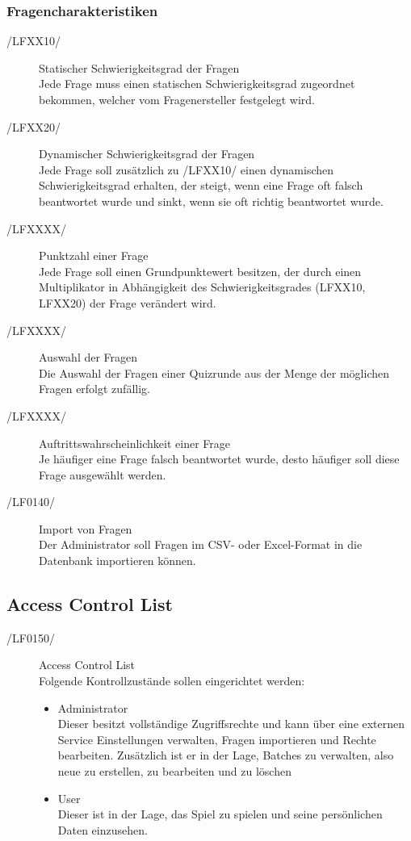 \documentclass[11pt,a4paper]{scrreprt}
\begin{document}
\subsubsection{Fragencharakteristiken}
\begin{description}
\item[/LFXX10/] Statischer Schwierigkeitsgrad der Fragen \\
Jede Frage muss einen statischen Schwierigkeitsgrad zugeordnet bekommen, welcher vom Fragenersteller festgelegt wird.

\item[/LFXX20/] Dynamischer Schwierigkeitsgrad der Fragen \\
Jede Frage soll zusätzlich zu /LFXX10/ einen dynamischen Schwierigkeitsgrad erhalten, der steigt, wenn eine Frage oft falsch beantwortet wurde und sinkt, wenn sie oft richtig beantwortet wurde.

\item[/LFXXXX/] Punktzahl einer Frage \\
Jede Frage soll einen Grundpunktewert besitzen, der durch einen Multiplikator in Abhängigkeit des Schwierigkeitsgrades (LFXX10, LFXX20) der Frage verändert wird.

\item[/LFXXXX/] Auswahl der Fragen \\
Die Auswahl der Fragen einer Quizrunde aus der Menge der möglichen Fragen erfolgt zufällig.

\item[/LFXXXX/] Auftrittswahrscheinlichkeit einer Frage \\
Je häufiger eine Frage falsch beantwortet wurde, desto häufiger soll diese Frage ausgewählt werden.

\item[/LF0140/] Import von Fragen \\
Der Administrator soll Fragen im CSV- oder Excel-Format in die Datenbank importieren können.
\end{description}

\subsection{Access Control List}
\begin{description}
\item[/LF0150/] Access Control List \\
Folgende Kontrollzustände sollen eingerichtet werden:
	\begin{itemize}
	\item Administrator \\
	Dieser besitzt vollständige Zugriffsrechte und kann über eine externen Service Einstellungen verwalten, Fragen 				importieren und Rechte bearbeiten. Zusätzlich ist er in der Lage, Batches zu verwalten, also neue zu erstellen, zu 			bearbeiten und zu löschen
	\item User \\
	Dieser ist in der Lage, das Spiel zu spielen und seine persönlichen Daten einzusehen.
	\end{itemize}

\end{description}
\end{document}
